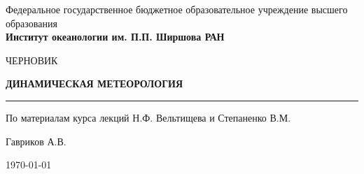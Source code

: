 \thispagestyle{empty}
\begin{center}
	\scriptsize
 Федеральное государственное бюджетное образовательное учреждение высшего образования\\
	\vspace{0.5ex}
 \large
	\textbf{Институт океанологии им. П.П. Ширшова РАН}
\end{center}

\vspace{5ex}
\begin{center}
	\vspace{10ex}

	\begin{large}
    	ЧЕРНОВИК
	\end{large}

	\vspace{7ex}

	\begin{huge}
		\textbf{ДИНАМИЧЕСКАЯ МЕТЕОРОЛОГИЯ} \\
	\end{huge} 
 
 	\noindent\rule{15cm}{0.4pt}
	
    \begin{large}
    	По материалам курса лекций Н.Ф. Вельтищева и Степаненко В.М.
	\end{large}

    \begin{flushright}
        Гавриков А.В.
    \end{flushright}

	\vspace{5ex}
	

	\vfill \today %
\end{center}

